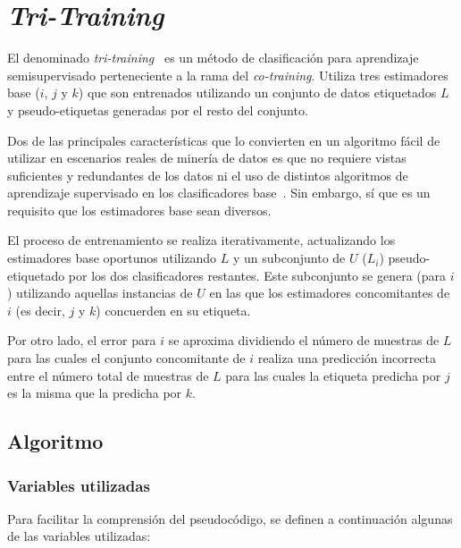 \section{\textit{Tri-Training}}
\label{tritraining-teoria}

El denominado \textit{tri-training}~\cite{tritraining2005@original} es un método de clasificación para aprendizaje semisupervisado perteneciente a la rama del \textit{co-training}. Utiliza tres estimadores base ($i$, $j$ y $k$) que son entrenados utilizando un conjunto de datos etiquetados $L$ y pseudo-etiquetas generadas por el resto del conjunto.

Dos de las principales características que lo convierten en un algoritmo fácil de utilizar en escenarios reales de minería de datos es que no requiere vistas suficientes y redundantes de los datos ni el uso de distintos algoritmos de aprendizaje supervisado en los clasificadores base~\cite{tritraining2005@original}. Sin embargo, sí que es un requisito que los estimadores base sean diversos.

El proceso de entrenamiento se realiza iterativamente, actualizando los estimadores base oportunos utilizando $L$ y un subconjunto de $U$ ($L_i$) pseudo-etiquetado por los dos clasificadores restantes. Este subconjunto se genera (para $i$) utilizando aquellas instancias de $U$ en las que los estimadores concomitantes de $i$ (es decir, $j$ y $k$) concuerden en su etiqueta.

Por otro lado, el error para $i$ se aproxima dividiendo el número de muestras de $L$ para las cuales el conjunto concomitante de $i$ realiza una predicción incorrecta entre el número total de muestras de $L$ para las cuales la etiqueta predicha por $j$ es la misma que la predicha por $k$.

\subsection{Algoritmo}

\subsubsection{Variables utilizadas}

Para facilitar la comprensión del pseudocódigo, se definen a continuación algunas de las variables utilizadas:

